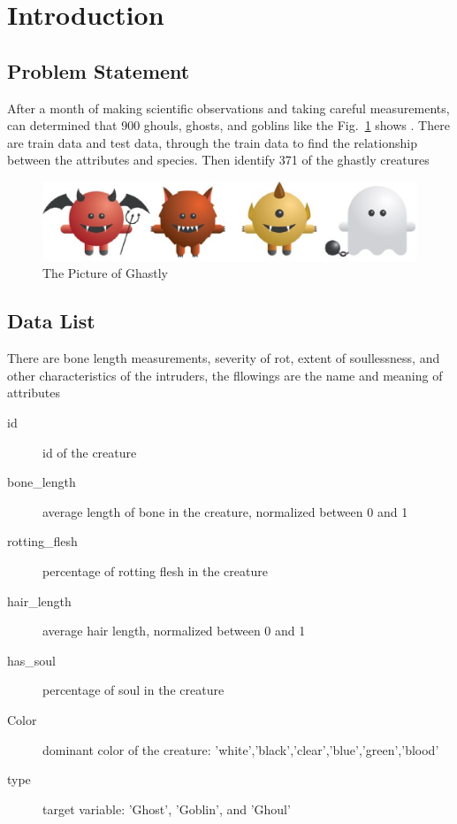 
\section{Introduction}\label{sec-intro}

\subsection{Problem Statement}


After a month of making scientific observations 
and taking careful measurements, 
can determined that 900 ghouls, ghosts, and goblins
like the Fig.~\ref{fig:animal} shows .
There are train data and test data,
through the train data to find the relationship
between the attributes and species.
Then identify 371 of the ghastly creatures


\begin{figure}[htbp]
	\centering
	\label{fig:animal}
	\includegraphics[scale=0.3]{figures/bar.eps}
	\caption{The Picture of Ghastly}
\end{figure}


\subsection{Data List}


There are bone length measurements, 
severity of rot, extent of soullessness, 
and other characteristics of the intruders,
the fllowings are the  
name and meaning of attributes


\begin{description}
	\item[id] id of the creature
	\item[bone_length] average length of bone in the creature, normalized between 0 and 1
	\item[rotting_flesh] percentage of rotting flesh in the creature
	\item[hair_length] average hair length, normalized between 0 and 1
	\item[has_soul] percentage of soul in the creature
	\item[Color] dominant color of the creature: 'white','black','clear','blue','green','blood'
	\item[type] target variable: 'Ghost', 'Goblin', and 'Ghoul'
\end{description}


